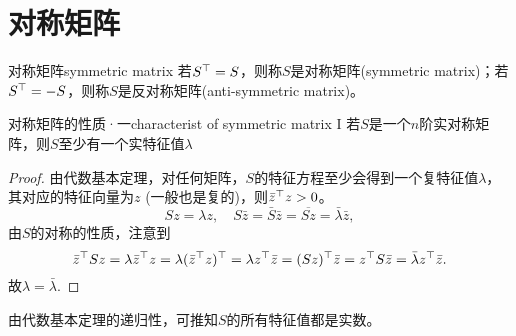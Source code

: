 \section{对称矩阵}

\begin{definition}
	{对称矩阵}{symmetric matrix}
	若$S^\top=S$，则称$S$是对称矩阵(symmetric matrix)；若$S^\top=-S$，则称$S$是反对称矩阵(anti-symmetric matrix)。
\end{definition}
\begin{theorem}{对称矩阵的性质·一}{characterist of symmetric matrix I}
	若$S$是一个$n$阶实对称矩阵，则$S$至少有一个实特征值$\lambda$
\end{theorem}
\begin{proof}
	由代数基本定理，对任何矩阵，$S$的特征方程至少会得到一个复特征值$\lambda$，其对应的特征向量为$z$ (一般也是复的)，则$\bar z^\top z>0$。
	\[
		Sz=\lambda z,\quad S\bar z=\bar S\bar z=\overline{Sz}=\bar\lambda\bar z,
	\]
	由$S$的对称的性质，注意到
	\[
		\bar z^\top Sz=\lambda\bar z^\top z=\lambda(\bar z^\top z)^\top=\lambda z^\top\bar z=(Sz)^\top\bar z=z^\top S\bar z=\bar\lambda z^\top\bar z.
	\]
	故$\lambda=\bar\lambda$.
\end{proof}

\begin{corollary}
	由代数基本定理的递归性，可推知$S$的所有特征值都是实数。
\end{corollary}


